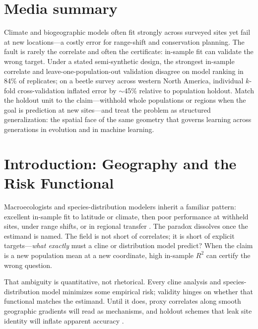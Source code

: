 \documentclass[11pt]{article}
\begin{document}
\section*{Media summary}
Climate and biogeographic models often fit strongly across surveyed sites yet
fail at new locations---a costly error for range-shift and conservation
planning.  The fault is rarely the correlate and often the certificate:
in-sample fit can validate the wrong target.  Under a stated semi-synthetic
design, the strongest in-sample correlate and leave-one-population-out
validation disagree on model ranking in 84\% of replicates; on a beetle
survey across western North America, individual $k$-fold cross-validation
inflated error by ${\sim}$45\% relative to population holdout.  Match the
holdout unit to the claim---withhold whole populations or regions when the
goal is prediction at new sites---and treat the problem as structured
generalization: the spatial face of the same geometry that governs learning
across generations in evolution and in machine learning.

\section{Introduction: Geography and the Risk Functional}
\label{sec:intro}

Macroecologists and species-distribution modelers inherit a familiar
pattern: excellent in-sample fit to latitude or climate, then poor performance
at withheld sites, under range shifts, or in regional transfer
\citep{araujo2006,ploton2020}.  The paradox dissolves once the estimand is
named.  The field is not short of correlates; it is short of explicit
targets---\emph{what exactly} must a cline or distribution model predict?
When the claim is a new population mean at a new coordinate, high in-sample
$R^2$ can certify the wrong question.

That ambiguity is quantitative, not rhetorical.  Every cline analysis and
species-distribution model minimizes some empirical risk; validity hinges on
whether that functional matches the estimand.  Until it does, proxy correlates
along smooth geographic gradients will read as mechanisms, and holdout schemes
that leak site identity will inflate apparent accuracy
\citep{roberts2017,ploton2020}.
\end{document}
